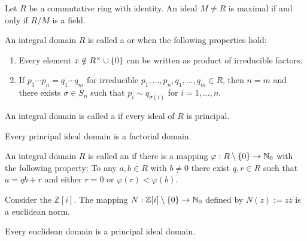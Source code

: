 \begin{proposition}
	Let $R$ be a commutative ring with identity. An ideal $M \neq R$ is maximal if and only if $R/M$ is a field.
\end{proposition}

\begin{definition}
	An integral domain $R$ is called a  or  when the following properties hold: 

	\begin{enumerate}
		\item Every element $x \notin R^\times \cup \cbr[0]{0}$ can be written as product of irreducible factors.

		\item If $p_1 \cdots p_n = q_1 \cdots q_m$ for irreducible $p_1,\dots,p_n,q_1,\dots,q_m \in R$, then $n = m$ and there exists $\sigma \in S_n$ such that $p_i \sim q_{\sigma(i)}$ for $i = 1,\dots,n$.
	\end{enumerate}
\end{definition}

\begin{definition}
	An integral domain is called a  if every ideal of $R$ is principal.
\end{definition}

\begin{theorem}
	Every principal ideal domain is a factorial domain.
\end{theorem}

\begin{definition}
	An integral domain $R$ is called an  if there is a mapping $\varphi: R \setminus \cbr[0]{0} \to \mathbb{N}_0$ with the following property: To any $a,b \in R$ with $b \neq 0$ there exist $q,r \in R$ such that $a = qb + r$ and either $r = 0$ or $\varphi(r) < \varphi(b)$.
\end{definition}

\begin{example}
	Consider the  $\mathbb{Z}[i]$. The mapping $N: \mathbb{Z}[i] \setminus \cbr[0]{0} \to \mathbb{N}_0$ defined by $N(z) := z \overline{z}$ is a euclidean norm. 
\end{example}

\begin{theorem}
	Every euclidean domain is a principal ideal domain.
\end{theorem}

